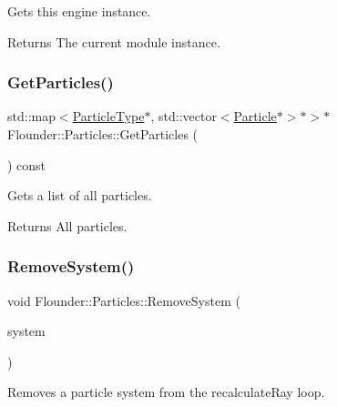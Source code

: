 Gets this engine instance. 

\begin{DoxyReturn}{Returns}
The current module instance. 
\end{DoxyReturn}
\mbox{\label{class_flounder_1_1_particles_a8e856a511e04a38fbb0b168bab418c48}} 
\subsubsection{\texorpdfstring{Get\+Particles()}{GetParticles()}}
{\footnotesize\ttfamily std\+::map$<$\hyperlink{class_flounder_1_1_particle_type}{Particle\+Type}$\ast$, std\+::vector$<$\hyperlink{class_flounder_1_1_particle}{Particle}$\ast$$>$$\ast$$>$$\ast$ Flounder\+::\+Particles\+::\+Get\+Particles (\begin{DoxyParamCaption}{ }\end{DoxyParamCaption}) const\hspace{0.3cm}{\ttfamily [inline]}}



Gets a list of all particles. 

\begin{DoxyReturn}{Returns}
All particles. 
\end{DoxyReturn}
\mbox{\label{class_flounder_1_1_particles_a6f70e6b3ba5e60cac13d200f93950627}} 
\subsubsection{\texorpdfstring{Remove\+System()}{RemoveSystem()}}
{\footnotesize\ttfamily void Flounder\+::\+Particles\+::\+Remove\+System (\begin{DoxyParamCaption}\item[{\hyperlink{class_flounder_1_1_particle_system}{Particle\+System} $\ast$}]{system }\end{DoxyParamCaption})}



Removes a particle system from the recalculate\+Ray loop. 


